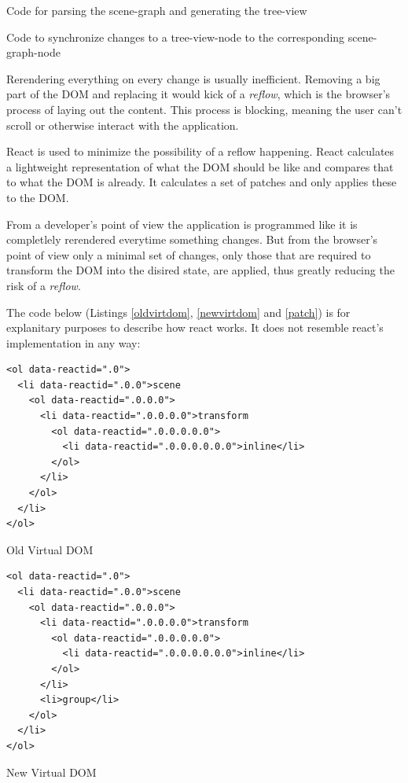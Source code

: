 \begin{enumerate*}
  \item Code for parsing the scene-graph and generating the tree-view
  \item Code to synchronize changes to a tree-view-node to the corresponding scene-graph-node
\end{enumerate*}

Rerendering everything on every change is usually inefficient. Removing a big part
of the \gls{DOM} and replacing it would kick of a \emph{reflow}, which is the browser's
process of laying out the content. This process is blocking, meaning the user can't
scroll or otherwise interact with the application. \cite{reflow}

React is used to minimize the possibility of a reflow happening. React
calculates a lightweight representation of what the \gls{DOM} should be like and
compares that to what the \gls{DOM} is already. It calculates a set of patches and
only applies these to the \gls{DOM}.

From a developer's point of view the application is programmed like it is
completlely rerendered everytime something changes. But from the browser's point
of view only a minimal set of changes, only those that are required to transform the
\gls{DOM} into the disired state, are applied, thus greatly reducing the risk of a \emph{reflow}.

The code below (Listings \ref{oldvirtdom}, \ref{newvirtdom} and \ref{patch}) is
for explanitary purposes to describe how react works. It does not resemble
react's implementation in any way:

\begin{listing}[H]
  \begin{verbatim}
<ol data-reactid=".0">
  <li data-reactid=".0.0">scene
    <ol data-reactid=".0.0.0">
      <li data-reactid=".0.0.0.0">transform
        <ol data-reactid=".0.0.0.0.0">
          <li data-reactid=".0.0.0.0.0.0">inline</li>
        </ol>
      </li>
    </ol>
  </li>
</ol>
  \end{verbatim}
  \caption{Old Virtual DOM}
  \label{oldvirtdom}
\end{listing}

\begin{listing}[H]
  \begin{verbatim}
<ol data-reactid=".0">
  <li data-reactid=".0.0">scene
    <ol data-reactid=".0.0.0">
      <li data-reactid=".0.0.0.0">transform
        <ol data-reactid=".0.0.0.0.0">
          <li data-reactid=".0.0.0.0.0.0">inline</li>
        </ol>
      </li>
      <li>group</li>
    </ol>
  </li>
</ol>
  \end{verbatim}
  \caption{New Virtual DOM}
  \label{newvirtdom}
\end{listing}

